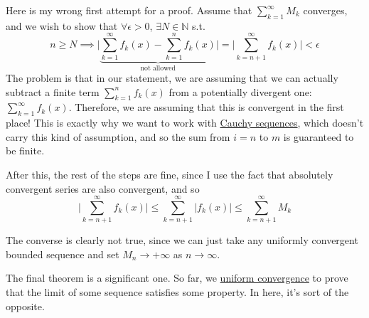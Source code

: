   Here is my wrong first attempt for a proof. Assume that $\sum_{k=1}^\infty M_k$ converges, and we wish to show that $\forall \epsilon > 0$, $\exists N \in \mathbb{N}$ s.t. 
  \begin{equation}
    n \geq N \implies \bigg| \underbrace{\sum_{k=1}^\infty f_k (x) - \sum_{k=1}^n f_k (x)}_{\text{not allowed}} \bigg| = \bigg| \sum_{k=n+1}^\infty f_k (x) \bigg|< \epsilon 
  \end{equation}
  The problem is that in our statement, we are assuming that we can actually subtract a finite term $\sum_{k=1}^n f_k (x)$ from a potentially divergent one: $\sum_{k=1}^\infty f_k(x)$. Therefore, we are assuming that this is convergent in the first place! This is exactly why we want to work with \hyperref[def:cauchy-sequence]{Cauchy sequences}, which doesn't carry this kind of assumption, and so the sum from $i=n$ to $m$ is guaranteed to be finite. 

  After this, the rest of the steps are fine, since I use the fact that absolutely convergent series are also convergent, and so 
  \begin{equation}
    \bigg| \sum_{k=n+1}^\infty f_k (x) \bigg| \leq \sum_{k=n+1}^\infty |f_k (x)| \leq \sum_{k=n+1}^\infty M_k
  \end{equation}

  \begin{example}
    \label{ex:converse-of-weierstrass-m-test-not-true}
    The converse is clearly not true, since we can just take any uniformly convergent bounded sequence and set $M_n \to +\infty$ as $n \to \infty$. 
  \end{example}

  The final theorem is a significant one. So far, we \hyperref[def:uniform-convergence]{uniform convergence} to prove that the limit of some sequence satisfies some property. In here, it's sort of the opposite. 


